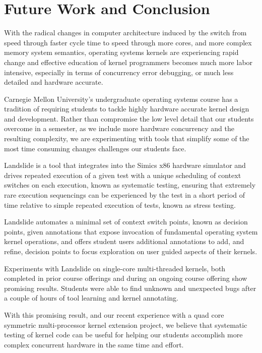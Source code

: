 \section{Future Work and Conclusion}
\label{sec:future}

With the radical changes in computer architecture induced by the switch from speed through faster cycle time to speed through more cores, and more complex memory system semantics, operating systems kernels are experiencing rapid change and effective education of kernel
programmers becomes much more labor intensive, especially in terms of concurrency error debugging, or much less detailed and hardware accurate.

Carnegie Mellon University's undergraduate operating systems course has a tradition of requiring students to tackle highly hardware accurate kernel design and development.
Rather than compromise the low level detail that our students overcome in a semester, as we include more hardware concurrency and the resulting complexity, we are experimenting with tools that simplify some of the most time consuming changes challenges our students face.

Landslide is a tool that integrates into the Simics x86 hardware simulator and drives repeated execution of a given test with a unique scheduling of context switches on each execution, known as systematic testing, ensuring that extremely rare execution sequencings can be
experienced by the test in a short period of time relative to simple repeated execution of tests, known as stress testing.

Landslide automates a minimal set of context switch points, known as decision points, given annotations that expose invocation of fundamental operating system kernel operations, and offers student users additional annotations to add, and refine, decision points to focus
exploration on user guided aspects of their kernels.

Experiments with Landslide on single-core multi-threaded kernels, both completed in prior course offerings and during an ongoing course offering show promising results.
Students were able to find unknown and unexpected bugs after a couple of hours of tool learning and kernel annotating.

With this promising result, and our recent experience with a quad core symmetric multi-processor kernel extension project, we believe that systematic testing of kernel code can be useful for helping our students accomplish more complex concurrent hardware in the same time and effort.

